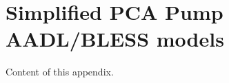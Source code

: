 
\cleardoublepage

\chapter{Simplified PCA Pump AADL/BLESS models}
\label{Appendix:AADL}

Content of this appendix.

